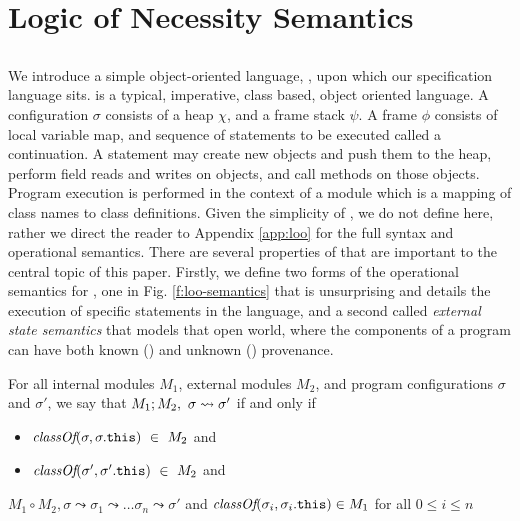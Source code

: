 \section{Logic of Necessity Semantics}
\label{s:semantics}

\subsection{\Loo}
We introduce a simple object-oriented language, \Loo, upon 
which our specification language sits. \Loo is a typical, imperative,
class based, object oriented language. A \Loo configuration $\sigma$ consists of a 
heap $\chi$, and a frame stack $\psi$. A frame $\phi$ consists of
local variable map, and sequence of statements to be executed called 
a continuation. A statement may create new objects and push them to the heap, 
perform field reads and writes on objects, and call methods on those objects. 
Program execution is performed in the context of a module which is a mapping
of class names to class definitions. Given the simplicity of \Loo, we do not
define \Loo here, rather we direct the reader to Appendix \ref{app:loo} for 
the full syntax and operational semantics. There are several properties 
of \Loo that are important to the central topic of this paper. Firstly,
we define two forms of the operational semantics for \Loo, one in Fig. \ref{f:loo-semantics}
that is unsurprising and details the execution of specific 
statements in the language, and a second called \emph{external state semantics} 
that models that open world, where the components of a program can
have both known (\internalO) and unknown (\externalO) provenance.
\begin{definition}
\label{def:pair-reduce}
For all internal modules $M_1$, external modules $M_2$, and program configurations $\sigma$ and $\sigma'$, 
we say that $M_1 ; M_2,\ \sigma \leadsto \sigma'$ if and only if
\begin{itemize}
\item
$\class{\sigma}{\sigma.\prg{this}}\ \in\ M_2$ and
\item
$\class{\sigma'}{\sigma'.\prg{this}}\ \in\ M_2$ and 
\end{itemize} 
$M_1 \circ M_2, \sigma \leadsto \sigma_1 \leadsto \ldots \sigma_n \leadsto \sigma'$ and $\textit{classOf}(\sigma_i, \sigma_i.{\texttt{this}}) \in M_1$ for all $0 \leq i \leq n$
\end{definition}
